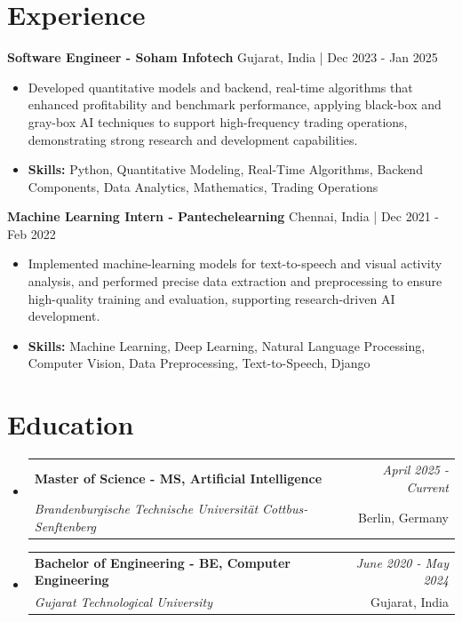 \documentclass[a4paper,11pt]{article}
\makeatletter
\newcommand{\resumeSubheading}[4]{
\vspace{0.5mm}\item
    \begin{tabular*}{\linewidth}[t]{l@{\extracolsep{\fill}}r}
        \textbf{#1} & \textit{\footnotesize{#4}} \\
        \textit{\footnotesize{#3}} &  \footnotesize{#2}\\
    \end{tabular*}
    \vspace{-2.4mm}
}
\makeatother
\begin{document}
\section{\textbf{Experience}}


\vspace{1mm}
  \textbf{Software Engineer - Soham Infotech} \hfill Gujarat, India | Dec 2023 - Jan 2025
\vspace{-1.5mm} %
\begin{itemize}
  \item Developed quantitative models and backend, real-time algorithms that enhanced profitability and benchmark performance, applying black-box and gray-box AI techniques to support high-frequency trading operations, demonstrating strong research and development capabilities.

\vspace{-2mm}
  \item \textbf{Skills:} Python, Quantitative Modeling, Real-Time Algorithms, Backend Components, Data Analytics, Mathematics, Trading Operations
\end{itemize}

\vspace{1mm}
  \textbf{Machine Learning Intern - Pantechelearning} \hfill Chennai, India | Dec 2021 - Feb 2022
\vspace{-1.5mm} %
\begin{itemize}
  \item Implemented machine-learning models for text-to-speech and visual activity analysis, and performed precise data extraction and preprocessing to ensure high-quality training and evaluation, supporting research-driven AI development.
\vspace{-2mm}
  \item \textbf{Skills:} Machine Learning, Deep Learning, Natural Language Processing, Computer Vision, Data Preprocessing, Text-to-Speech, Django
\end{itemize}\section{\textbf{Education}}
\vspace{-0.4mm}

\begin{itemize}[leftmargin=0.15in, label={}]
\resumeSubheading
{Master of Science - MS, Artificial Intelligence }{Berlin, Germany}
{Brandenburgische Technische Universität Cottbus-Senftenberg  }{April 2025 - Current}

\vspace{1.0mm} %
\resumeSubheading
{Bachelor of Engineering - BE, Computer Engineering  }{Gujarat, India}
{Gujarat Technological University }{June 2020 - May 2024}

\end{itemize}
\end{document}

